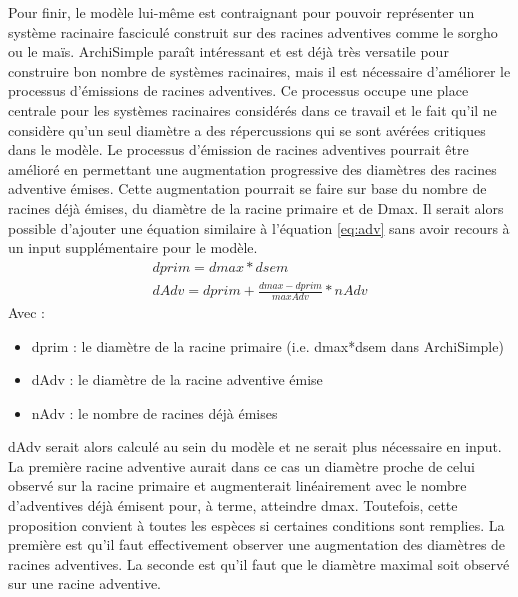 Pour finir, le modèle lui-même est contraignant pour pouvoir représenter un système racinaire fasciculé construit sur des racines adventives comme le sorgho ou le maïs.
ArchiSimple paraît intéressant et est déjà très versatile pour construire bon nombre de systèmes racinaires, mais il est nécessaire d'améliorer le processus d'émissions de racines adventives.
Ce processus occupe une place centrale pour les systèmes racinaires considérés dans ce travail et le fait qu'il ne considère qu'un seul diamètre a des répercussions qui se sont avérées critiques dans le modèle.
Le processus d'émission de racines adventives pourrait être amélioré en permettant une augmentation progressive des diamètres des racines adventive émises.
Cette augmentation pourrait se faire sur base du nombre de racines déjà émises, du diamètre de la racine primaire et de Dmax.
Il serait alors possible d'ajouter une équation similaire à l'équation \ref{eq:adv} sans avoir recours à un input supplémentaire pour le modèle.
\begin{equation}
    \begin{gathered}
        dprim = dmax*dsem \\
        dAdv = dprim + \frac{dmax - dprim}{maxAdv}*nAdv
    \end{gathered}
    \label{eq:adv}
\end{equation}
Avec :
\begin{itemize}
    \item dprim : le diamètre de la racine primaire (i.e. dmax*dsem dans ArchiSimple)
    \item dAdv : le diamètre de la racine adventive émise
    \item nAdv : le nombre de racines déjà émises
\end{itemize}
dAdv serait alors calculé au sein du modèle et ne serait plus nécessaire en input.
La première racine adventive aurait dans ce cas un diamètre proche de celui observé sur la racine primaire et augmenterait linéairement avec le nombre d'adventives déjà émisent pour, à terme, atteindre dmax.
Toutefois, cette proposition convient à toutes les espèces si certaines conditions sont remplies. 
La première est qu'il faut effectivement observer une augmentation des diamètres de racines adventives.
La seconde est qu'il faut que le diamètre maximal soit observé sur une racine adventive.
